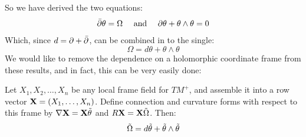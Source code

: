 So we have derived the two equations:
%
$$ \bar{\partial} \theta = \Omega \quad \text{ and } \quad \partial \theta + \theta \wedge \theta = 0 $$
%
Which, since $d = \partial + \bar{\partial}$, can be combined in to the single:
%
$$ \Omega = d \theta + \theta \wedge \theta $$
%
We would like to remove the dependence on a holomorphic coordinate frame from these results, and in fact, this can be very easily done:
%
\begin{prop} Let $X_1, X_2, \ldots, X_n$ be any local frame field for $TM^{+}$, and assemble it into a row vector $\mathbf{X} = (X_1, \ldots, X_n)$. Define connection and curvature forms with respect to this frame by $ \nabla \mathbf{X} = \mathbf{X} \tilde{\theta} $ and $ R \mathbf{X} = \mathbf{X} \tilde{\Omega} $.  Then:
%
$$ \tilde{\Omega} = d \tilde{\theta} + \tilde{\theta} \wedge \tilde{\theta} $$
%
\end{prop}

